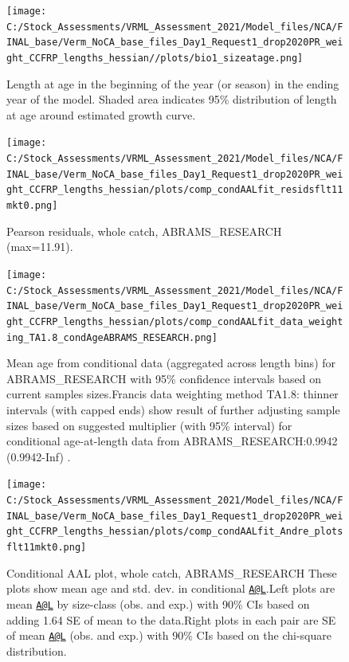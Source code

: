 \documentclass[
  english,
  a4paper,
]{article}
\begin{document}
\begin{figure}
\centering
\texttt{[image: C:/Stock\_Assessments/VRML\_Assessment\_2021/Model\_files/NCA/FINAL\_base/Verm\_NoCA\_base\_files\_Day1\_Request1\_drop2020PR\_weight\_CCFRP\_lengths\_hessian//plots/bio1\_sizeatage.png]}
\caption{Length at age in the beginning of the year (or season) in the ending year of the model. Shaded area indicates 95\% distribution of length at age around estimated growth curve.\label{fig:fittedgrowth}}
\end{figure}

\FloatBarrier

\FloatBarrier

\begin{figure}
\centering
\texttt{[image: C:/Stock\_Assessments/VRML\_Assessment\_2021/Model\_files/NCA/FINAL\_base/Verm\_NoCA\_base\_files\_Day1\_Request1\_drop2020PR\_weight\_CCFRP\_lengths\_hessian/plots/comp\_condAALfit\_residsflt11mkt0.png]}
\caption{Pearson residuals, whole catch, ABRAMS\_RESEARCH (max=11.91).\label{fig:comp_condAALfit_residsflt11mkt0}}
\end{figure}

\begin{figure}
\centering
\texttt{[image: C:/Stock\_Assessments/VRML\_Assessment\_2021/Model\_files/NCA/FINAL\_base/Verm\_NoCA\_base\_files\_Day1\_Request1\_drop2020PR\_weight\_CCFRP\_lengths\_hessian/plots/comp\_condAALfit\_data\_weighting\_TA1.8\_condAgeABRAMS\_RESEARCH.png]}
\caption{Mean age from conditional data (aggregated across length bins) for ABRAMS\_RESEARCH with 95\% confidence intervals based on current samples sizes.Francis data weighting method TA1.8: thinner intervals (with capped ends) show result of further adjusting sample sizes based on suggested multiplier (with 95\% interval) for conditional age-at-length data from ABRAMS\_RESEARCH:0.9942 (0.9942-Inf) .\label{fig:comp_condAALfit_data_weighting_TA1.8_condAgeABRAMS_RESEARCH}}
\end{figure}

\begin{figure}
\centering
\texttt{[image: C:/Stock\_Assessments/VRML\_Assessment\_2021/Model\_files/NCA/FINAL\_base/Verm\_NoCA\_base\_files\_Day1\_Request1\_drop2020PR\_weight\_CCFRP\_lengths\_hessian/plots/comp\_condAALfit\_Andre\_plotsflt11mkt0.png]}
\caption{Conditional AAL plot, whole catch, ABRAMS\_RESEARCH
These plots show mean age and std. dev. in conditional \href{mailto:A@L}{\nolinkurl{A@L}}.Left plots are mean \href{mailto:A@L}{\nolinkurl{A@L}} by size-class (obs. and exp.) with 90\% CIs based on adding 1.64 SE of mean to the data.Right plots in each pair are SE of mean \href{mailto:A@L}{\nolinkurl{A@L}} (obs. and exp.) with 90\% CIs based on the chi-square distribution.\label{fig:comp_condAALfit_Andre_plotsflt11mkt0}}
\end{figure}
\end{document}
